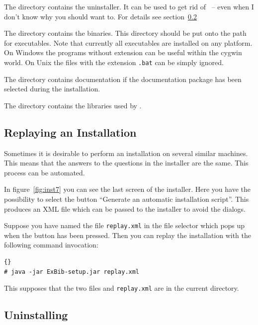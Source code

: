 The directory  contains the uninstaller. It can be
used to get rid of \ExBib\ -- even when I don't know why you should
want to. For details see section~\ref{sec:uninst}

The directory  contains the binaries. This directory should
be put onto the path for executables. Note that currently all
executables are installed on any platform. On Windows the programs
without extension can be useful within the cygwin world. On Unix the
files with the extension \verb|.bat| can be simply ignored.

The directory  contains documentation if the documentation
package has been selected during the installation.

The directory  contains the libraries used by \ExBib.


\subsection{Replaying an Installation}\label{sec:replay}

Sometimes it is desirable to perform an installation on several
similar machines. This means that the answers to the questions in the
installer are the same. This process can be automated.

In figure~\ref{fig:inst7} you can see the last screen of the
installer. Here you have the possibility to select the button
``Generate an automatic installation script''. This produces an XML
file which can be passed to the installer to avoid the
dialogs.

Suppose you have named the file \texttt{replay.xml} in the file
selector which pops up when the button has been pressed. Then you can
replay the installation with the following command invocation:

\begin{lstlisting}{}
# java -jar ExBib-setup.jar replay.xml
\end{lstlisting}

This supposes that the two files  and
\texttt{replay.xml} are in the current directory.

\subsection{Uninstalling \ExBib}\label{sec:uninst}

